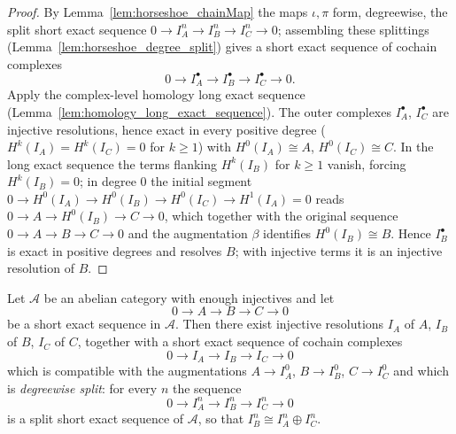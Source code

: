 \begin{proof}
  By Lemma~\ref{lem:horseshoe_chainMap} the maps \(\iota, \pi\) form, degreewise, the
  split short exact sequence \(0 \to I_A^n \to I_B^n \to I_C^n \to 0\); assembling these
  splittings (Lemma~\ref{lem:horseshoe_degree_split}) gives a short exact sequence of
  cochain complexes
  \[
    0 \longrightarrow I_A^\bullet \longrightarrow I_B^\bullet
      \longrightarrow I_C^\bullet \longrightarrow 0 .
  \]
  Apply the complex-level homology long exact sequence
  (Lemma~\ref{lem:homology_long_exact_sequence}). The outer complexes \(I_A^\bullet\),
  \(I_C^\bullet\) are injective resolutions, hence exact in every positive degree
  (\(H^{k}(I_A) = H^{k}(I_C) = 0\) for \(k \geq 1\)) with \(H^0(I_A) \cong A\),
  \(H^0(I_C) \cong C\). In the long exact sequence the terms flanking \(H^{k}(I_B)\) for
  \(k \geq 1\) vanish, forcing \(H^{k}(I_B) = 0\); in degree \(0\) the initial segment
  \(0 \to H^0(I_A) \to H^0(I_B) \to H^0(I_C) \to H^1(I_A) = 0\) reads
  \(0 \to A \to H^0(I_B) \to C \to 0\), which together with the original sequence
  \(0 \to A \to B \to C \to 0\) and the augmentation \(\beta\) identifies
  \(H^0(I_B) \cong B\). Hence \(I_B^\bullet\) is exact in positive degrees and resolves
  \(B\); with injective terms it is an injective resolution of \(B\).
\end{proof}

\begin{lemma}
  \label{lem:injective_resolution_of_ses}
  Let \(\mathcal{A}\) be an abelian category with enough injectives and let
  \[
    0 \longrightarrow A \longrightarrow B \longrightarrow C \longrightarrow 0
  \]
  be a short exact sequence in \(\mathcal{A}\). Then there exist injective
  resolutions \(I_A\) of \(A\), \(I_B\) of \(B\), \(I_C\) of \(C\), together with a
  short exact sequence of cochain complexes
  \[
    0 \longrightarrow I_A \longrightarrow I_B \longrightarrow I_C \longrightarrow 0
  \]
  which is compatible with the augmentations \(A \to I_A^0\), \(B \to I_B^0\),
  \(C \to I_C^0\) and which is \emph{degreewise split}: for every \(n\) the sequence
  \[
    0 \longrightarrow I_A^n \longrightarrow I_B^n \longrightarrow I_C^n
      \longrightarrow 0
  \]
  is a split short exact sequence of \(\mathcal{A}\), so that
  \(I_B^n \cong I_A^n \oplus I_C^n\).
\end{lemma}

